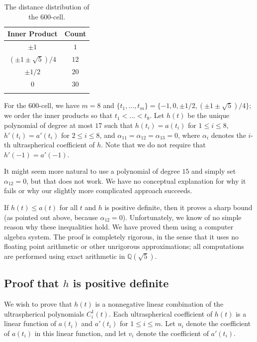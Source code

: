 \documentclass{jams-l}
\theoremstyle{plain}
\numberwithin{theorem}{section}
\theoremstyle{definition}
\numberwithin{equation}{section}
\newcommand{\Q}{{\mathbb Q}}
\begin{document}
\begin{table}
\caption{The distance distribution of the $600$-cell.}\label{tab:dist}
\begin{center}
\begin{tabular}{cc}
Inner Product & Count\\
\hline $\pm 1$ & $1$\\
$(\pm 1 \pm \sqrt{5})/4$ & $12$\\
$\pm 1/2$ & $20$\\
$0$ & $30$\\
\\ %
\end{tabular}
\end{center}
\end{table}

For the $600$-cell, we have $m=8$ and $\{t_1,\dots,t_m\} = \{-1,
0, \pm 1/2, (\pm 1 \pm \sqrt{5})/4\}$; we order the inner products
so that $t_1 < \dots < t_8$. Let $h(t)$ be the unique polynomial
of degree at most $17$ such that $h(t_i) = a(t_i)$ for $1 \le i
\le 8$, $h'(t_i) = a'(t_i)$ for $2 \le i \le 8$, and $\alpha_{11}
= \alpha_{12} = \alpha_{13} = 0$, where $\alpha_i$ denotes the
$i$-th ultraspherical coefficient of $h$. Note that we do not
require that $h'(-1) = a'(-1)$.

It might seem more natural to use a polynomial of degree $15$ and
simply set $\alpha_{12}=0$, but that does not work.  We have no
conceptual explanation for why it fails or why our slightly more
complicated approach succeeds.

If $h(t) \le a(t)$ for all $t$ and $h$ is positive definite, then
it proves a sharp bound (as pointed out above, because
$\alpha_{12}=0$). Unfortunately, we know of no simple reason why
these inequalities hold.  We have proved them using a computer
algebra system.  The proof is completely rigorous, in the sense
that it uses no floating point arithmetic or other unrigorous
approximations;  all computations are performed using exact
arithmetic in $\Q(\sqrt{5})$.

\subsection{Proof that $h$ is positive definite}

We wish to prove that $h(t)$ is a nonnegative linear combination
of the ultraspherical polynomials $C^1_i(t)$.  Each ultraspherical
coefficient of $h(t)$ is a linear function of $a(t_i)$ and
$a'(t_i)$ for $1 \le i \le m$.  Let $u_i$ denote the coefficient
of $a(t_i)$ in this linear function, and let $v_i$ denote the
coefficient of $a'(t_i)$.
\end{document}
